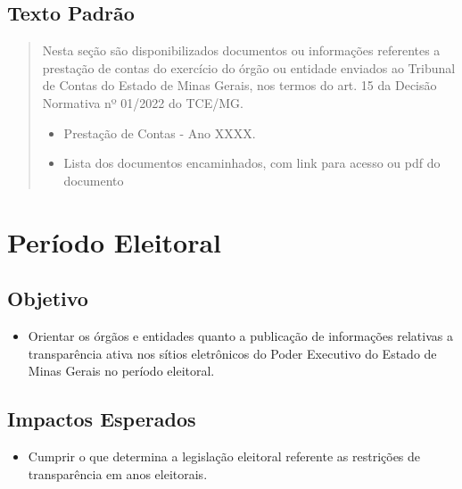 \documentclass[
]{book}
\providecommand{\tightlist}{%
  \setlength{\itemsep}{0pt}\setlength{\parskip}{0pt}}
\begin{document}
\hypertarget{texto-padruxe3o-13}{%
\subsection{Texto Padrão}\label{texto-padruxe3o-13}}

\begin{quote}
Nesta seção são disponibilizados documentos ou informações referentes a prestação de contas do exercício do órgão ou entidade enviados ao Tribunal de Contas do Estado de Minas Gerais, nos termos do art. 15 da Decisão Normativa nº 01/2022 do TCE/MG.

\begin{itemize}
\item
  Prestação de Contas - Ano XXXX.
\item
  Lista dos documentos encaminhados, com link para acesso ou pdf do documento
\end{itemize}
\end{quote}

\hypertarget{peruxedodo-eleitoral}{%
\section{Período Eleitoral}\label{peruxedodo-eleitoral}}

\hypertarget{objetivo-13}{%
\subsection{Objetivo}\label{objetivo-13}}

\begin{itemize}
\tightlist
\item
  Orientar os órgãos e entidades quanto a publicação de informações relativas a transparência ativa nos sítios eletrônicos do Poder Executivo do Estado de Minas Gerais no período eleitoral.
\end{itemize}

\hypertarget{impactos-esperados-14}{%
\subsection{Impactos Esperados}\label{impactos-esperados-14}}

\begin{itemize}
\tightlist
\item
  Cumprir o que determina a legislação eleitoral referente as restrições de transparência em anos eleitorais.
\end{itemize}
\end{document}
